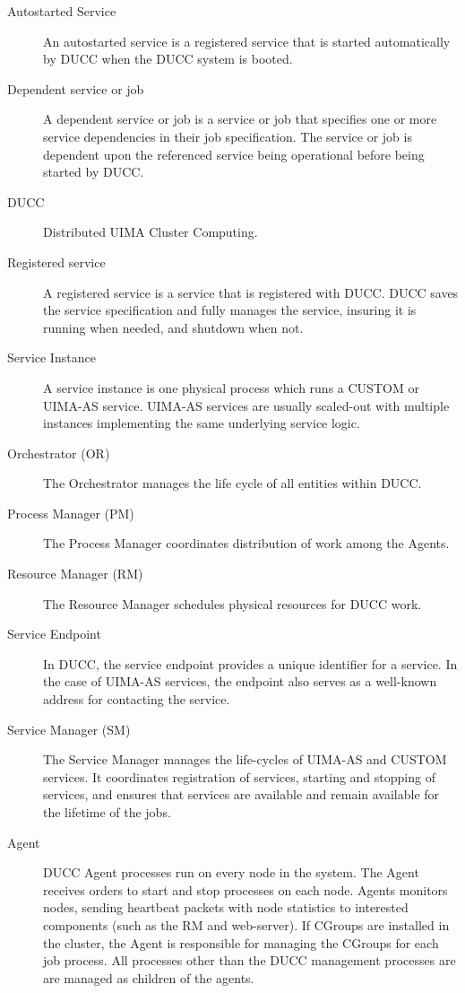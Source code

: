 \begin{description}
\item[Autostarted Service] An autostarted service is a registered service that is started automatically
  by DUCC when the DUCC system is booted.

\item[Dependent service or job] A dependent service or job is a service or job that specifies one
  or more service dependencies in their job specification. The service or job is dependent upon the
  referenced service being operational before being started by DUCC.

\item[DUCC] Distributed UIMA Cluster Computing.

\item[Registered service] A registered service is a service that is registered with DUCC. DUCC
  saves the service specification and fully manages the service, insuring it is running when needed,
  and shutdown when not.

\item[Service Instance] A service instance is one physical process which runs a CUSTOM or UIMA-AS
  service.  UIMA-AS services are usually scaled-out with multiple instances implementing the
  same underlying service logic.

\item[Orchestrator (OR)] The Orchestrator manages the life cycle of all entities within DUCC.

\item[Process Manager (PM) ] The Process Manager coordinates distribution of work among the Agents.

\item[Resource Manager (RM) ] The Resource Manager schedules physical resources for DUCC work.

\item[Service Endpoint] In DUCC, the service endpoint provides a unique identifier for a service. In
  the case of UIMA-AS services, the endpoint also serves as a well-known address for contacting the
  service. 

\item[Service Manager (SM)] The Service Manager manages the life-cycles of UIMA-AS and CUSTOM
  services. It coordinates registration of services, starting and stopping of services, and ensures
  that services are available and remain available for the lifetime of the jobs.

\item[Agent] DUCC Agent processes run on every node in the system. The Agent receives orders to
  start and stop processes on each node. Agents monitors nodes, sending heartbeat packets with node
  statistics to interested components (such as the RM and web-server). If CGroups are installed in
  the cluster, the Agent is responsible for managing the CGroups for each job process. All processes
  other than the DUCC management processes are are managed as children of the agents.


\end{description}
